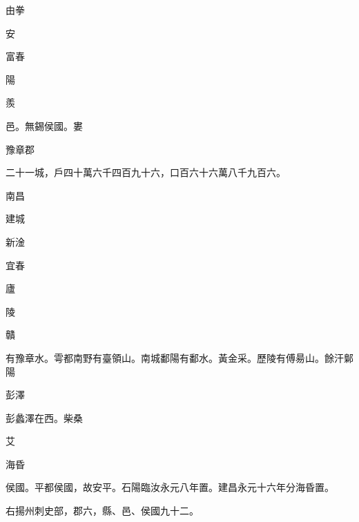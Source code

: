 \begin{pinyinscope}
由拳

安

富春

陽

羨

邑。無錫侯國。婁

豫章郡

二十一城，戶四十萬六千四百九十六，口百六十六萬八千九百六。

南昌

建城

新淦

宜春

廬

陵

贛

有豫章水。雩都南野有臺領山。南城鄱陽有鄱水。黃金采。歷陵有傅昜山。餘汗鄡陽

彭澤

彭蠡澤在西。柴桑

艾

海昏

侯國。平都侯國，故安平。石陽臨汝永元八年置。建昌永元十六年分海昏置。

右揚州刺史部，郡六，縣、邑、侯國九十二。


\end{pinyinscope}